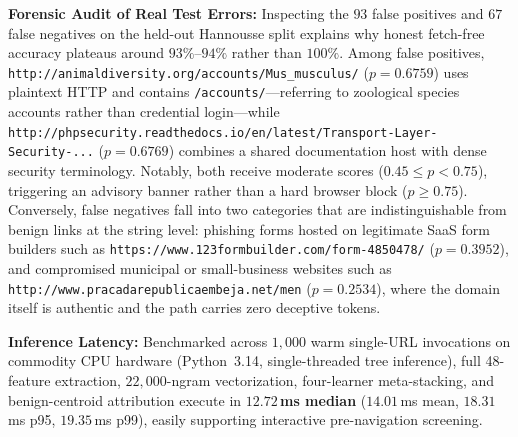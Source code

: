 \documentclass[conference]{IEEEtran}
\begin{document}
\textbf{Forensic Audit of Real Test Errors:} Inspecting the $93$ false positives and $67$ false negatives on the held-out Hannousse split explains why honest fetch-free accuracy plateaus around $93\%$--$94\%$ rather than $100\%$. Among false positives, \texttt{http://animaldiversity.org/\allowbreak accounts/\allowbreak Mus\_musculus/} ($p=0.6759$) uses plaintext HTTP and contains \texttt{/accounts/}---referring to zoological species accounts rather than credential login---while \texttt{http://phpsecurity.\allowbreak readthedocs.io/\allowbreak en/latest/\allowbreak Transport-Layer-Security-...} ($p=0.6769$) combines a shared documentation host with dense security terminology. Notably, both receive moderate scores ($0.45 \le p < 0.75$), triggering an advisory banner rather than a hard browser block ($p \ge 0.75$). Conversely, false negatives fall into two categories that are indistinguishable from benign links at the string level: phishing forms hosted on legitimate SaaS form builders such as \texttt{https://www.\allowbreak 123formbuilder.com/\allowbreak form-4850478/} ($p=0.3952$), and compromised municipal or small-business websites such as \texttt{http://www.\allowbreak pracadarepublicaembeja.net/\allowbreak men} ($p=0.2534$), where the domain itself is authentic and the path carries zero deceptive tokens.

\textbf{Inference Latency:} Benchmarked across $1{,}000$ warm single-URL invocations on commodity CPU hardware (Python~3.14, single-threaded tree inference), full 48-feature extraction, $22{,}000$-ngram vectorization, four-learner meta-stacking, and benign-centroid attribution execute in \textbf{$12.72$\,ms median} ($14.01$\,ms mean, $18.31$\,ms p95, $19.35$\,ms p99), easily supporting interactive pre-navigation screening.
\end{document}
